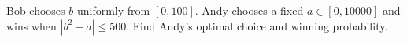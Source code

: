 Bob chooses $b$ uniformly from $[0,100]$. Andy chooses a fixed $a\in[0,10000]$ and wins when $|b^2-a|\le500$. Find Andy's optimal choice and winning probability.
